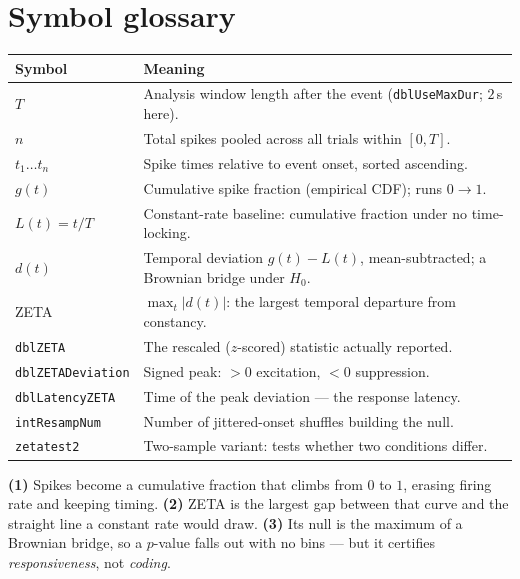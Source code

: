 \documentclass[11pt]{article}
\begin{document}
\section{Symbol glossary}

\begin{center}
\begin{tabular}{@{}ll@{}}
\toprule
\textbf{Symbol} & \textbf{Meaning} \\
\midrule
$T$            & Analysis window length after the event (\texttt{dblUseMaxDur}; $2$\,s here). \\
$n$            & Total spikes pooled across all trials within $[0,T]$. \\
$t_1\dots t_n$ & Spike times relative to event onset, sorted ascending. \\
$g(t)$         & Cumulative spike fraction (empirical CDF); runs $0\to 1$. \\
$L(t)=t/T$     & Constant-rate baseline: cumulative fraction under no time-locking. \\
$d(t)$         & Temporal deviation $g(t)-L(t)$, mean-subtracted; a Brownian bridge under $H_0$. \\
ZETA           & $\max_t|d(t)|$: the largest temporal departure from constancy. \\
\texttt{dblZETA} & The rescaled ($z$-scored) statistic actually reported. \\
\texttt{dblZETADeviation} & Signed peak: $>0$ excitation, $<0$ suppression. \\
\texttt{dblLatencyZETA}   & Time of the peak deviation --- the response latency. \\
\texttt{intResampNum}     & Number of jittered-onset shuffles building the null. \\
\texttt{zetatest2}        & Two-sample variant: tests whether two conditions differ. \\
\bottomrule
\end{tabular}
\end{center}

\vspace{1.2em}
\begin{keybox}
\textbf{(1)} Spikes become a cumulative fraction that climbs from $0$ to $1$,
erasing firing rate and keeping timing. \textbf{(2)} ZETA is the largest gap
between that curve and the straight line a constant rate would draw.
\textbf{(3)} Its null is the maximum of a Brownian bridge, so a $p$-value falls
out with no bins --- but it certifies \emph{responsiveness}, not \emph{coding}.
\end{keybox}
\end{document}
